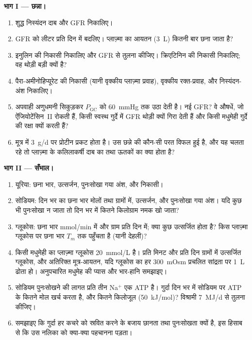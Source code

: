 \begin{problem}
\medskip
\noindent\textbf{भाग I --- छन्ना।}
\begin{enumerate}
  \item शुद्ध निस्यंदन दाब और GFR निकालिए।
  \item GFR को लीटर प्रति दिन में बदलिए। प्लाज़्मा का आयतन
        (\qty{3}{L}) कितनी बार छना जाता है?
  \item इनुलिन की निकासी निकालिए और GFR से तुलना कीजिए। क्रिएटिनिन की
        निकासी निकालिए; वह थोड़ी बड़ी क्यों है?
  \item पैरा-अमीनोहिप्यूरेट की निकासी (यानी वृक्कीय प्लाज़्मा प्रवाह),
        वृक्कीय रक्त-प्रवाह, और निस्यंदन-अंश निकालिए।
  \item अपवाही अणुधमनी सिकुड़कर $P_{\text{GC}}$ को \qty{60}{mmHg} तक
        उठा देती है। नई GFR? वे औषधें, जो ऐंजियोटेंसिन~II रोकती हैं,
        किसी स्वस्थ गुर्दे में GFR थोड़ी क्यों गिरा देती हैं और किसी
        मधुमेही गुर्दे की रक्षा क्यों करती हैं?
  \item मूत्र में \qty{3}{g/d} पर प्रोटीन प्रकट होता है। उस छन्ने की
        कौन-सी परत विफल हुई है, और यह चलता रहे तो प्लाज़्मा के
        कलिलाकर्षी दाब का तथा ऊतकों का क्या होता है?
\end{enumerate}

\medskip
\noindent\textbf{भाग II --- सँभाल।}
\begin{enumerate}[resume]
  \item यूरिया: छना भार, उत्सर्जन, पुनःसोखा गया अंश, और निकासी।
  \item सोडियम: दिन भर का छना भार मोलों तथा ग्रामों में, उत्सर्जन, और
        पुनःसोखा गया अंश। यदि कुछ भी पुनःसोखा न जाता तो दिन भर में
        कितने किलोग्राम नमक खो जाता?
  \item ग्लूकोस: छना भार mmol/min में और ग्राम प्रति दिन में; क्या कुछ
        उत्सर्जित होता है? किस प्लाज़्मा ग्लूकोस पर छना भार
        $T_{m}$ तक पहुँचता है (यानी देहली)?
  \item किसी मधुमेही का प्लाज़्मा ग्लूकोस \qty{20}{mmol/L} है। प्रति
        मिनट और प्रति दिन ग्रामों में उत्सर्जित ग्लूकोस, और अतिरिक्त
        मूत्र-आयतन, यदि ग्लूकोस का हर \qty{300}{mOsm} प्रचलित सांद्रता
        पर \qty{1}{L} ढोता हो। अनुपचारित मधुमेह की प्यास और भार-हानि
        समझाइए।
  \item सोडियम पुनःसोखने की लागत प्रति तीन Na$^{+}$ एक ATP है। गुर्दा
        दिन भर में सोडियम पर ATP के कितने मोल खर्च करता है, और कितने
        किलोजूल (\qty{50}{kJ/mol})? विश्रामी \qty{7}{MJ/d} से तुलना
        कीजिए।
  \item समझाइए कि गुर्दा हर कचरे को स्रवित करने के बजाय छानता तथा
        पुनःसोखता क्यों है, इस हिसाब से कि उस नलिका को क्या-क्या
        पहचानना पड़ता।
\end{enumerate}


\end{problem}
